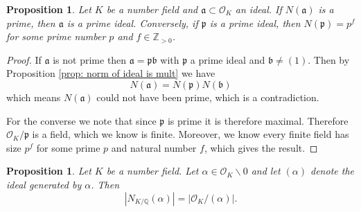 \documentclass[11pt,a4paper]{report}
\theoremstyle{plain}
\newtheorem{prop}[subsection]{Proposition}
\theoremstyle{definition}
\theoremstyle{definition}
\newcommand{\ZZ}{\mathbb{Z}}
\def\QQ{\mathbb{Q}}
\def\gothb{\mathfrak{b}}
\def\gothp{\mathfrak{p}}
\def \a{\alpha}
\def \OO {\mathcal{O}}
\def\gotha{\mathfrak{a}}
\begin{document}
\begin{prop}
Let $K$ be a number field and $\gotha \subset \OO_K$ an ideal. If $N(\gotha)$ is a prime, then $\gotha$ is a prime ideal. Conversely, if $\gothp$ is a prime ideal, then $N(\gothp)=p^f$ for some prime number $p$ and $f \in \ZZ_{> 0}$.
\end{prop}

\begin{proof}
If $\gotha$ is not prime then $\gotha=\gothp\gothb$ with $\gothp$ a prime ideal and $\gothb \neq (1)$. Then by Proposition \ref{prop: norm of ideal is mult} we have \[N(\gotha)=N(\gothp)N(\gothb)\] which means $N(\gotha)$ could not have been prime, which is a contradiction.

For the converse we note that since $\gothp$ is prime it is therefore maximal. Therefore $\OO_K/\gothp$ is a field, which we know is finite. Moreover, we know every finite field has size $p^f$ for some prime $p$ and natural number $f$, which gives the result.
\end{proof}



\begin{prop}\label{prop: ideal norm coincides with other norm}
Let $K$ be a number field. Let $\a \in \OO_K \backslash 0$ and let $(\a)$ denote the ideal generated by $\a$. Then \[|N_{K/\QQ}(\a)|=|\OO_K / (\a)|.\]
\end{prop}
\end{document}
